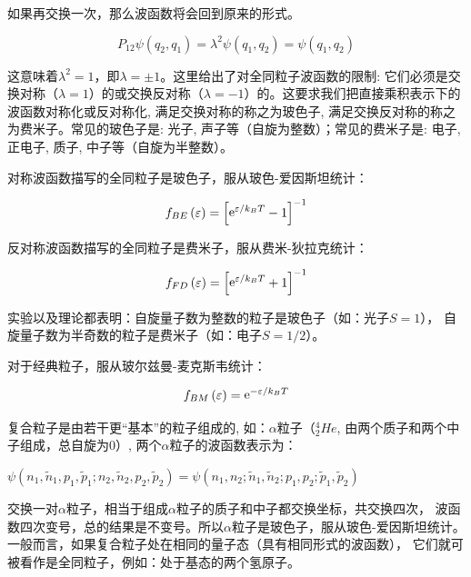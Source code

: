 如果再交换一次，那么波函数将会回到原来的形式。

\begin{equation*}
  P_{12} \psi (q_2,q_1) = \lambda^2 \psi(q_1,q_2) = \psi(q_1,q_2)
\end{equation*}


这意味着$ \lambda^2 =1 $，即$ \lambda = \pm
1$。这里给出了对全同粒子波函数的限制: 它们必须是交换对称（$ \lambda
= 1 $）的或交换反对称（$ \lambda =
-1$）的。这要求我们把直接乘积表示下的波函数对称化或反对称化,
满足交换对称的称之为玻色子,
满足交换反对称的称之为费米子。常见的玻色子是: 光子,
声子等（自旋为整数）；常见的费米子是: 电子, 正电子, 质子,
中子等（自旋为半整数）。


对称波函数描写的全同粒子是玻色子，服从玻色-爱因斯坦统计：


\begin{equation}\label{31-3}
f_{BE} \left( \varepsilon  \right) = \left[ {{\mathop{\rm e}\nolimits} ^{\varepsilon /k_B T}  - 1} \right]^{ - 1}
\end{equation}


反对称波函数描写的全同粒子是费米子，服从费米-狄拉克统计：


\begin{equation}\label{31-4}
f_{FD} \left( \varepsilon  \right) = \left[ {{\mathop{\rm e}\nolimits} ^{\varepsilon /k_B T}  + 1} \right]^{ - 1}
\end{equation}

实验以及理论都表明：自旋量子数为整数的粒子是玻色子（如：光子$S=1$），
自旋量子数为半奇数的粒子是费米子（如：电子$S=1/2$）。

对于经典粒子，服从玻尔兹曼-麦克斯韦统计：

\begin{equation}\label{31-5}
f_{BM} \left( \varepsilon  \right) = {\mathop{\rm e}\nolimits} ^{ - \varepsilon /k_B T}
\end{equation}


复合粒子是由若干更``基本''的粒子组成的, 如：$\alpha$粒子（$_2^4 He$,
由两个质子和两个中子组成，总自旋为$0$）,
两个$\alpha$粒子的波函数表示为：

$\psi \left( {n_1 ,\tilde n_1 ,p_1 ,\tilde p_1 ;n_2 ,\tilde n_2 ,p_2 ,\tilde p_2 } \right) = \psi \left( {n_1 ,n_2 ;\tilde n_1 ,\tilde n_2 ;p_1 ,p_2 ;\tilde p_1 ,\tilde p_2 } \right)$

交换一对$\alpha$粒子，相当于组成$\alpha$粒子的质子和中子都交换坐标，共交换四次，
波函数四次变号，总的结果是不变号。所以$\alpha$粒子是玻色子，服从玻色-爱因斯坦统计。
一般而言，如果复合粒子处在相同的量子态（具有相同形式的波函数），
它们就可被看作是全同粒子，例如：处于基态的两个氢原子。

